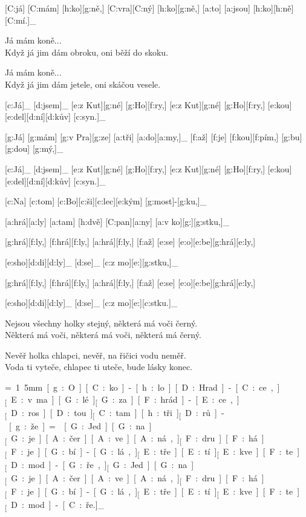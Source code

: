 [C:já] [C:mám] [h:ko][g:ně,] [C:vra][C:ný] [h:ko][g:ně,] %
[a:to] [a:jsou] [h:ko][h:ně] [C:mí.]_

Já mám koně...\\
Když já jim dám obroku, oni běží do skoku.

Já mám koně...\\
Když já jim dám jetele, oni skáčou vesele.



[c:Já]_ [d:jsem]_ [e:z Kut][g:né] [g:Ho][f:ry,] %
[e:z Kut][g:né] [g:Ho][f:ry,] [e:kou][e:del][d:ní][d:kův] [c:syn.]_

[g:Já] [g:mám] [g:v Pra][g:ze] [a:tři] [a:do][a:my,]_
[f:až] [f:je] [f:kou][f:pím,] [g:bu][g:dou] [g:mý,]_

[c:Já]_ [d:jsem]_ [e:z Kut][g:né] [g:Ho][f:ry,] %
[e:z Kut][g:né] [g:Ho][f:ry,] [e:kou][e:del][d:ní][d:kův] [c:syn.]_



[c:Na] [c:tom] [c:Bo][c:ši][c:lec][e:kým] [g:most]-[g:ku,]_

[a:hrá][a:ly] [a:tam] [h:dvě] [C:pan][a:ny] [a:v ko][g:][g:stku,]_

[g:hrá][f:ly,] [f:hrá][f:ly,] [a:hrá][f:ly,] %
[f:až] [e:se] [e:o][e:be][g:hrá][e:ly,]

[e:sho][d:di][d:ly]_ [d:se]_ [c:z mo][e:][g:stku,]_

[g:hrá][f:ly,] [f:hrá][f:ly,] [a:hrá][f:ly,] %
[f:až] [e:se] [e:o][e:be][g:hrá][e:ly,]

[e:sho][d:di][d:ly]_ [d:se]_ [c:z mo][e:][c:stku.]_

Nejsou všechny holky stejný, některá má voči černý.\\
Některá má voči, některá má voči, některá má černý.

Nevěř holka chlapci, nevěř, na řičici vodu neměř.\\
Voda ti vyteče, chlapec ti uteče, bude lásky konec.



{\unit=1.5mm
[g:O][C:ko]-[h:lo] [D:Hrad]-[C:ce,]_ [E:v ma][G:lé]_ [G:za][F:hrád]-[E:ce,]_

[D:ros][D:tou]_ [C:tam] [h:tři]_ [D:rů]-[g:že.]_

\min=
[G:Jed][G:na]_ [G:je] [A:čer][A:ve][A:ná,]_
[F:dru][F:há]_ [F:je] [G:bí]-[G:lá,]_

[E:tře][E:tí]_ [E:kve][F:te]_ [D:mod]-[G:ře,]_

[G:Jed][G:na]_ [G:je] [A:čer][A:ve][A:ná,]_
[F:dru][F:há]_ [F:je] [G:bí]-[G:lá,]_

[E:tře][E:tí]_ [E:kve][F:te]_ [D:mod]-[C:ře.]_
}


